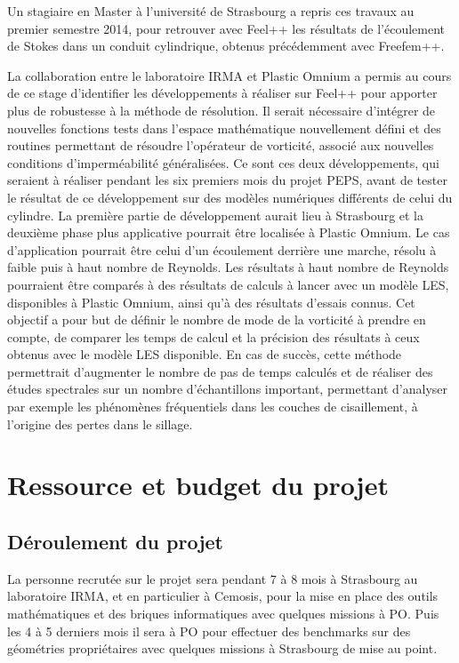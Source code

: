 \documentclass[12pt]{article} \usepackage{fontspec}
\begin{document}
Un stagiaire en Master à l’université de Strasbourg a  repris ces travaux au
premier semestre 2014, pour retrouver avec Feel++ les résultats de l’écoulement
de Stokes dans un conduit cylindrique, obtenus précédemment avec Freefem++.

La collaboration entre le laboratoire IRMA et Plastic Omnium a permis au cours
de ce stage d’identifier les développements à réaliser sur Feel++ pour apporter
plus de robustesse à la méthode de résolution. Il serait nécessaire d’intégrer
de nouvelles fonctions tests dans l’espace mathématique nouvellement défini et
des routines permettant de résoudre l’opérateur de vorticité, associé aux
nouvelles conditions d’imperméabilité généralisées. Ce sont ces deux
développements, qui seraient à réaliser pendant les six premiers mois du projet
PEPS, avant de tester le résultat de ce développement sur des modèles numériques
différents de celui du cylindre. La première partie de développement aurait lieu
à Strasbourg et la deuxième phase plus applicative pourrait être localisée à
Plastic Omnium. Le cas d’application pourrait être celui d’un écoulement
derrière une marche, résolu à faible puis à haut nombre de Reynolds. Les
résultats à haut nombre de Reynolds pourraient être comparés à des résultats de
calculs à lancer avec un modèle LES, disponibles à Plastic Omnium, ainsi qu’à des
résultats d’essais connus. Cet objectif a pour but de définir le nombre de mode
de la vorticité à prendre en compte, de comparer les temps de calcul et la
précision des résultats à ceux obtenus avec le modèle LES disponible. En cas de
succès, cette méthode permettrait d’augmenter le nombre de pas de temps calculés
et de  réaliser des études spectrales sur un nombre d’échantillons important,
permettant d’analyser par exemple les phénomènes fréquentiels dans les couches
de cisaillement, à l’origine des pertes dans le sillage.



\section{Ressource et budget du projet}
\label{sec:budget}

\subsection{Déroulement du projet}
\label{sec:dero-du-proj}

La personne recrutée sur le projet sera pendant 7 à 8 mois à Strasbourg au
laboratoire IRMA, et en particulier à Cemosis, pour la mise en place des outils
mathématiques et des briques informatiques avec quelques missions à PO. Puis les
4 à 5 derniers mois il sera à PO pour effectuer des benchmarks sur des
géométries propriétaires avec quelques missions à Strasbourg de mise au point.
\end{document}
